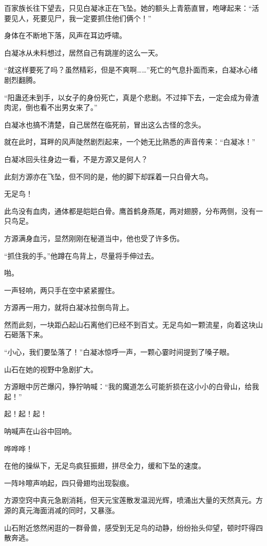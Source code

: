 \begin{this_body}
百家族长往下望去，只见白凝冰正在飞坠。她的额头上青筋直冒，咆哮起来：“活要见人，死要见尸，我一定要抓住他们俩个！”

身体在不断地下落，风声在耳边呼啸。

白凝冰从未料想过，居然自己有跳崖的这么一天。

“就这样要死了吗？虽然精彩，但是不爽啊……”死亡的气息扑面而来，白凝冰心绪剧烈翻腾。

“阳蛊还未到手，以女子的身份死亡，真是个悲剧。不过摔下去，一定会成为骨渣肉泥，倒也看不出男女来了。”

白凝冰也搞不清楚，自己居然在临死前，冒出这么古怪的念头。

就在此时，耳畔的风声陡然剧烈起来，一个她无比熟悉的声音传来：“白凝冰！”

白凝冰回头往身边一看，不是方源又是何人？

此刻方源亦在飞坠，但不同的是，他的脚下却踩着一只白骨大鸟。

无足鸟！

此鸟没有血肉，通体都是皑皑白骨。鹰首鹤身燕尾，两对翅膀，分布两侧，没有一只鸟足。

方源满身血污，显然刚刚在秘道当中，他也受了许多伤。

“抓住我的手。”他蹲在鸟背上，尽量将手伸过去。

啪。

一声轻响，两只手在空中紧紧握住。

方源再一用力，就将白凝冰拉倒鸟背上。

然而此刻，一块距凸起山石离他们已经不到百丈。无足鸟如一颗流星，向着这块山石砸落下来。

“小心，我们要坠落了！”白凝冰惊呼一声，一颗心霎时间提到了嗓子眼。

山石在她的视野中急剧扩大。

方源眼中厉芒爆闪，狰狞呐喊：“我的魔道怎么可能折损在这小小的白骨山，给我起！”

起！起！起！

呐喊声在山谷中回响。

哗哗哗！

在他的操纵下，无足鸟疯狂振翅，拼尽全力，缓和下坠的速度。

一阵咔嚓声响起，四只骨翅均出现裂痕。

方源空窍中真元急剧消耗，但天元宝莲散发温润光辉，喷涌出大量的天然真元。方源的真元海面消减的同时，又暴涨。

山石附近悠然闲逛的一群骨兽，感受到无足鸟的动静，纷纷抬头仰望，顿时吓得四散奔逃。


\end{this_body}
